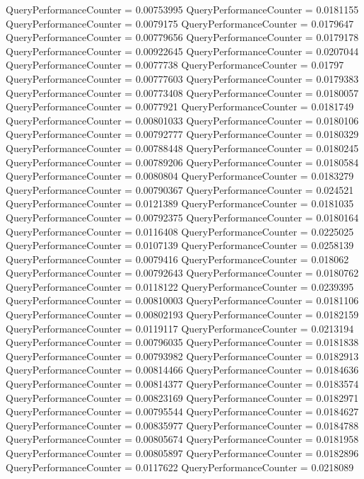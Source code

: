 \documentclass[9pt]{article}
\theoremstyle{plain}
\theoremstyle{definition}
\theoremstyle{remark}
\numberwithin{equation}{section}
\begin{document}
QueryPerformanceCounter  =  0.00753995
QueryPerformanceCounter  =  0.0181155
QueryPerformanceCounter  =  0.0079175
QueryPerformanceCounter  =  0.0179647
QueryPerformanceCounter  =  0.00779656
QueryPerformanceCounter  =  0.0179178
QueryPerformanceCounter  =  0.00922645
QueryPerformanceCounter  =  0.0207044
QueryPerformanceCounter  =  0.0077738
QueryPerformanceCounter  =  0.01797
QueryPerformanceCounter  =  0.00777603
QueryPerformanceCounter  =  0.0179383
QueryPerformanceCounter  =  0.00773408
QueryPerformanceCounter  =  0.0180057
QueryPerformanceCounter  =  0.0077921
QueryPerformanceCounter  =  0.0181749
QueryPerformanceCounter  =  0.00801033
QueryPerformanceCounter  =  0.0180106
QueryPerformanceCounter  =  0.00792777
QueryPerformanceCounter  =  0.0180329
QueryPerformanceCounter  =  0.00788448
QueryPerformanceCounter  =  0.0180245
QueryPerformanceCounter  =  0.00789206
QueryPerformanceCounter  =  0.0180584
QueryPerformanceCounter  =  0.0080804
QueryPerformanceCounter  =  0.0183279
QueryPerformanceCounter  =  0.00790367
QueryPerformanceCounter  =  0.024521
QueryPerformanceCounter  =  0.0121389
QueryPerformanceCounter  =  0.0181035
QueryPerformanceCounter  =  0.00792375
QueryPerformanceCounter  =  0.0180164
QueryPerformanceCounter  =  0.0116408
QueryPerformanceCounter  =  0.0225025
QueryPerformanceCounter  =  0.0107139
QueryPerformanceCounter  =  0.0258139
QueryPerformanceCounter  =  0.0079416
QueryPerformanceCounter  =  0.018062
QueryPerformanceCounter  =  0.00792643
QueryPerformanceCounter  =  0.0180762
QueryPerformanceCounter  =  0.0118122
QueryPerformanceCounter  =  0.0239395
QueryPerformanceCounter  =  0.00810003
QueryPerformanceCounter  =  0.0181106
QueryPerformanceCounter  =  0.00802193
QueryPerformanceCounter  =  0.0182159
QueryPerformanceCounter  =  0.0119117
QueryPerformanceCounter  =  0.0213194
QueryPerformanceCounter  =  0.00796035
QueryPerformanceCounter  =  0.0181838
QueryPerformanceCounter  =  0.00793982
QueryPerformanceCounter  =  0.0182913
QueryPerformanceCounter  =  0.00814466
QueryPerformanceCounter  =  0.0184636
QueryPerformanceCounter  =  0.00814377
QueryPerformanceCounter  =  0.0183574
QueryPerformanceCounter  =  0.00823169
QueryPerformanceCounter  =  0.0182971
QueryPerformanceCounter  =  0.00795544
QueryPerformanceCounter  =  0.0184627
QueryPerformanceCounter  =  0.00835977
QueryPerformanceCounter  =  0.0184788
QueryPerformanceCounter  =  0.00805674
QueryPerformanceCounter  =  0.0181958
QueryPerformanceCounter  =  0.00805897
QueryPerformanceCounter  =  0.0182896
QueryPerformanceCounter  =  0.0117622
QueryPerformanceCounter  =  0.0218089
\end{document}

